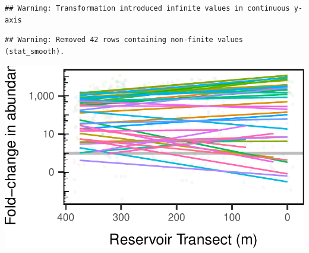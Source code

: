\documentclass[]{article}
\begin{document}
\begin{verbatim}
## Warning: Transformation introduced infinite values in continuous y-axis
\end{verbatim}

\begin{verbatim}
## Warning: Removed 42 rows containing non-finite values (stat_smooth).
\end{verbatim}

\begin{center}\includegraphics[width=0.7\linewidth]{ReservoirGradient_files/figure-latex/fold_change_plot-1} \end{center}
\end{document}
